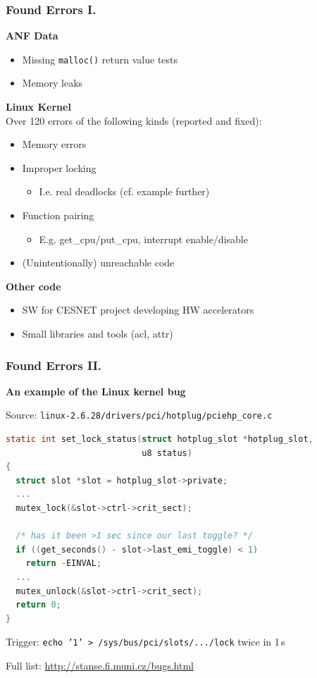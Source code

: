 \documentclass[xcolor=dvipsnames]{beamer}
\newcommand{\heading}[1]{\textbf{\textcolor{BurntOrange}{#1}}}
\begin{document}
\begin{frame}
  \frametitle{Found Errors I.}
  
  \heading{ANF Data}
  \begin{itemize}
  \item Missing \texttt{malloc()} return value tests
  \item Memory leaks
  \end{itemize}

  \pause
  \medskip

  \heading{Linux Kernel}\\
  Over 120 errors of the following kinds (reported and fixed):
  \begin{itemize}
  \item Memory errors
  \item Improper locking
    \begin{itemize}
    \item I.e. real deadlocks (cf. example further)
    \end{itemize}
  \item Function pairing
    \begin{itemize}
    \item E.g. get\_cpu/put\_cpu, interrupt enable/disable
    \end{itemize}
  \item (Unintentionally) unreachable code
  \end{itemize}

  \pause
  \medskip

  \heading{Other code}
  \begin{itemize}
  \item SW for CESNET project developing HW accelerators
  \item Small libraries and tools (acl, attr)
  \end{itemize}
\end{frame}

\begin{frame}[fragile]
  \frametitle{Found Errors II.}

  \heading{An example of the Linux kernel bug}

  Source: \texttt{\small linux-2.6.28/drivers/pci/hotplug/pciehp\_core.c}
  \begin{lstlisting}[language=C]
static int set_lock_status(struct hotplug_slot *hotplug_slot,
                           u8 status)
{
  struct slot *slot = hotplug_slot->private;
  ...
  mutex_lock(&slot->ctrl->crit_sect);

  /* has it been >1 sec since our last toggle? */
  if ((get_seconds() - slot->last_emi_toggle) < 1)
    return -EINVAL;
  ...
  mutex_unlock(&slot->ctrl->crit_sect);
  return 0;
}
  \end{lstlisting}

  Trigger: \texttt{\small echo '1' > /sys/bus/pci/slots/.../lock} twice in 1\,s

  \pause
  \medskip

  Full list: \url{http://stanse.fi.muni.cz/bugs.html}

\end{frame}
\end{document}
